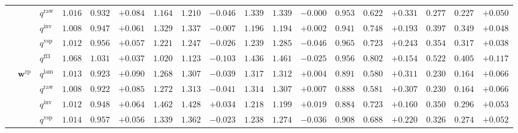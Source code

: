\documentclass[eng]{kjas3}
\begin{document}
\begin{table}[t]
{\begin{tabular}{lll ccc ccc ccc ccc ccc}
 &  & $q^{\mathrm{raw}}$ & $1.016$ & $0.932$ & \cellcolor{posgreen!50}$+0.084$ & $1.164$ & $1.210$ & \cellcolor{negred!50}$-0.046$ & $1.339$ & $1.339$ & $-0.000$ & $0.953$ & $0.622$ & \cellcolor{posgreen!50}$+0.331$ & $0.277$ & $0.227$ & \cellcolor{posgreen!50}$+0.050$ \\
 &  & $q^{\mathrm{inv}}$ & $1.008$ & $0.947$ & \cellcolor{posgreen!50}$+0.061$ & $1.329$ & $1.337$ & \cellcolor{negred!50}$-0.007$ & $1.196$ & $1.194$ & \cellcolor{posgreen!50}$+0.002$ & $0.941$ & $0.748$ & \cellcolor{posgreen!50}$+0.193$ & $0.397$ & $0.349$ & \cellcolor{posgreen!50}$+0.048$ \\
 &  & $q^{\mathrm{vsp}}$ & $1.012$ & $0.956$ & \cellcolor{posgreen!50}$+0.057$ & $1.221$ & $1.247$ & \cellcolor{negred!50}$-0.026$ & $1.239$ & $1.285$ & \cellcolor{negred!50}$-0.046$ & $0.965$ & $0.723$ & \cellcolor{posgreen!50}$+0.243$ & $0.354$ & $0.317$ & \cellcolor{posgreen!50}$+0.038$ \\
 &  & $q^{\mathrm{ff3}}$ & $1.068$ & $1.031$ & \cellcolor{posgreen!50}$+0.037$ & $1.020$ & $1.123$ & \cellcolor{negred!50}$-0.103$ & $1.436$ & $1.461$ & \cellcolor{negred!50}$-0.025$ & $0.956$ & $0.802$ & \cellcolor{posgreen!50}$+0.154$ & $0.522$ & $0.405$ & \cellcolor{posgreen!50}$+0.117$ \\
\cmidrule(lr){2-18}
 & $\mathbf{w}^{\mathrm{rp}}$ & $q^{\mathrm{lam}}$ & $1.013$ & $0.923$ & \cellcolor{posgreen!50}$+0.090$ & $1.268$ & $1.307$ & \cellcolor{negred!50}$-0.039$ & $1.317$ & $1.312$ & \cellcolor{posgreen!50}$+0.004$ & $0.891$ & $0.580$ & \cellcolor{posgreen!50}$+0.311$ & $0.230$ & $0.164$ & \cellcolor{posgreen!50}$+0.066$ \\
 &  & $q^{\mathrm{raw}}$ & $1.008$ & $0.922$ & \cellcolor{posgreen!50}$+0.085$ & $1.272$ & $1.313$ & \cellcolor{negred!50}$-0.041$ & $1.314$ & $1.307$ & \cellcolor{posgreen!50}$+0.007$ & $0.888$ & $0.581$ & \cellcolor{posgreen!50}$+0.307$ & $0.230$ & $0.164$ & \cellcolor{posgreen!50}$+0.066$ \\
 &  & $q^{\mathrm{inv}}$ & $1.012$ & $0.948$ & \cellcolor{posgreen!50}$+0.064$ & $1.462$ & $1.428$ & \cellcolor{posgreen!50}$+0.034$ & $1.218$ & $1.199$ & \cellcolor{posgreen!50}$+0.019$ & $0.884$ & $0.723$ & \cellcolor{posgreen!50}$+0.160$ & $0.350$ & $0.296$ & \cellcolor{posgreen!50}$+0.053$ \\
 &  & $q^{\mathrm{vsp}}$ & $1.014$ & $0.957$ & \cellcolor{posgreen!50}$+0.056$ & $1.339$ & $1.362$ & \cellcolor{negred!50}$-0.023$ & $1.238$ & $1.274$ & \cellcolor{negred!50}$-0.036$ & $0.908$ & $0.688$ & \cellcolor{posgreen!50}$+0.220$ & $0.326$ & $0.274$ & \cellcolor{posgreen!50}$+0.052$ \\

\end{tabular}}
\end{table}
\end{document}
